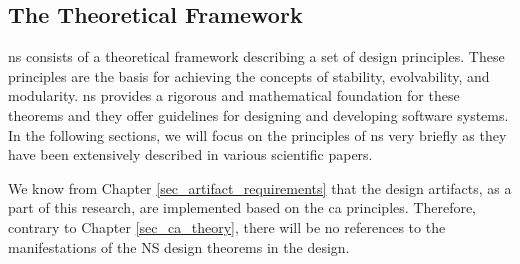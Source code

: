 \subsection{The Theoretical Framework} \label{subsec_ns_desing_theorems}

\gls{ns} consists of a theoretical framework describing a set of design principles. These
principles are the basis for achieving the concepts of stability, evolvability, and
modularity. \gls{ns} provides a rigorous and mathematical foundation for these theorems
and they offer guidelines for designing and developing software systems. In the following
sections, we will focus on the principles of \gls{ns} very briefly as they have been
extensively described in various scientific papers.

We know from Chapter \ref{sec_artifact_requirements} that the design artifacts, as a part
of this research, are implemented based on the \gls{ca} principles. Therefore, contrary to
Chapter \ref{sec_ca_theory}, there will be no references to the manifestations of the NS
design theorems in the design.




